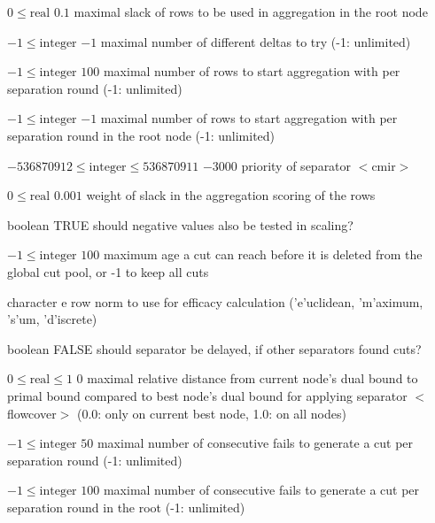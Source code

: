 %
{$0\leq\textrm{real}$}%
{$0.1$}%
{maximal slack of rows to be used in aggregation in the root node}%
{}

%
{$-1\leq\textrm{integer}$}%
{$-1$}%
{maximal number of different deltas to try (-1: unlimited)}%
{}

%
{$-1\leq\textrm{integer}$}%
{$100$}%
{maximal number of rows to start aggregation with per separation round (-1: unlimited)}%
{}

%
{$-1\leq\textrm{integer}$}%
{$-1$}%
{maximal number of rows to start aggregation with per separation round in the root node (-1: unlimited)}%
{}

%
{$-536870912\leq\textrm{integer}\leq536870911$}%
{$-3000$}%
{priority of separator $<$cmir$>$}%
{}

%
{$0\leq\textrm{real}$}%
{$0.001$}%
{weight of slack in the aggregation scoring of the rows}%
{}

%
{boolean}%
{TRUE}%
{should negative values also be tested in scaling?}%
{}

%
{$-1\leq\textrm{integer}$}%
{$100$}%
{maximum age a cut can reach before it is deleted from the global cut pool, or -1 to keep all cuts}%
{}

%
{character}%
{e}%
{row norm to use for efficacy calculation ('e'uclidean, 'm'aximum, 's'um, 'd'iscrete)}%
{}

%
{boolean}%
{FALSE}%
{should separator be delayed, if other separators found cuts?}%
{}

%
{$0\leq\textrm{real}\leq1$}%
{$0$}%
{maximal relative distance from current node's dual bound to primal bound compared to best node's dual bound for applying separator $<$flowcover$>$ (0.0: only on current best node, 1.0: on all nodes)}%
{}

%
{$-1\leq\textrm{integer}$}%
{$50$}%
{maximal number of consecutive fails to generate a cut per separation round (-1: unlimited)}%
{}

%
{$-1\leq\textrm{integer}$}%
{$100$}%
{maximal number of consecutive fails to generate a cut per separation round in the root (-1: unlimited)}%
{}

